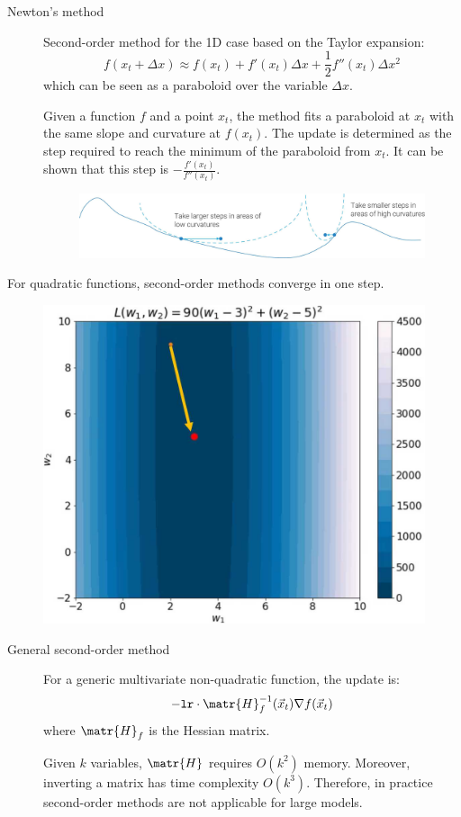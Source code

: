 \begin{description}
    \item[Newton's method] 
        Second-order method for the 1D case based on the Taylor expansion:
        \[ f(x_t + \Delta x) \approx f(x_t) + f'(x_t)\Delta x + \frac{1}{2}f''(x_t)\Delta x^2 \]
        which can be seen as a paraboloid over the variable $\Delta x$.

        Given a function $f$ and a point $x_t$, the method fits a paraboloid at $x_t$ with the same slope and curvature at $f(x_t)$. The update is determined as the step required to reach the minimum of the paraboloid from $x_t$. It can be shown that this step is $-\frac{f'(x_t)}{f''(x_t)}$.

        \begin{figure}[H]
            \centering
            \includegraphics[width=0.7\linewidth]{./img/_2order_optimizer.jpg}
        \end{figure}
\end{description}

\begin{remark}
    For quadratic functions, second-order methods converge in one step.
    \begin{figure}[H]
        \centering
        \includegraphics[width=0.35\linewidth]{./img/2order_1step.jpg}
    \end{figure}
\end{remark}

\begin{description}
    \item[General second-order method] 
        For a generic multivariate non-quadratic function, the update is:
        \[ -\texttt{lr} \cdot \matr{H}_f^{-1}(\vec{x}_t) \nabla f(\vec{x}_t) \]
        where $\matr{H}_f$ is the Hessian matrix.

        \begin{remark}
            Given $k$ variables, $\matr{H}$ requires $O(k^2)$ memory. Moreover, inverting a matrix has time complexity $O(k^3)$. Therefore, in practice second-order methods are not applicable for large models.
        \end{remark}
\end{description}



